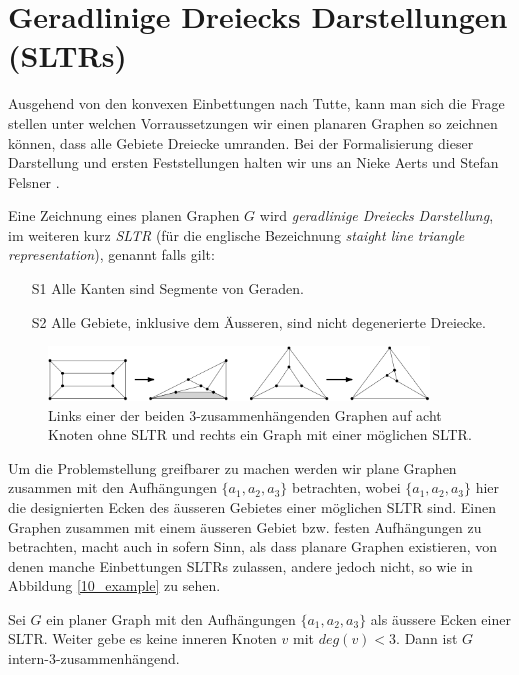 \section{Geradlinige Dreiecks Darstellungen (SLTRs)}

Ausgehend von den konvexen Einbettungen nach Tutte, kann man sich die Frage stellen unter welchen Vorraussetzungen wir einen planaren Graphen so zeichnen können, dass alle Gebiete Dreiecke umranden. Bei der Formalisierung dieser Darstellung und ersten Feststellungen halten wir uns an Nieke Aerts und Stefan Felsner \cite{af13,af15}.

\begin{definition}[SLTR]\label{defsltr}
Eine Zeichnung eines planen Graphen $G$ wird \textit{geradlinige Dreiecks Darstellung}, im weiteren kurz \textit{SLTR} (für die englische Bezeichnung \textit{staight line triangle representation}), genannt falls gilt:
\begin{itemize}
\item[S1] Alle Kanten sind Segmente von Geraden.
\item[S2] Alle Gebiete, inklusive dem Äusseren, sind nicht degenerierte Dreiecke.
\end{itemize}
\end{definition}

\begin{figure}[h]
	\centering
  \includegraphics[width=0.9\textwidth]{sltr-example.png}
	\caption{Links einer der beiden 3-zusammenhängenden Graphen auf acht Knoten ohne SLTR und rechts ein Graph mit einer möglichen SLTR.}
\end{figure}

Um die Problemstellung greifbarer zu machen werden wir plane Graphen zusammen mit den Aufhängungen $\{a_1,a_2,a_3\}$ betrachten, wobei $\{a_1,a_2,a_3\}$ hier die designierten Ecken des äusseren Gebietes einer möglichen SLTR sind. Einen Graphen zusammen mit einem äusseren Gebiet bzw. festen Aufhängungen zu betrachten, macht auch in sofern Sinn, als dass planare Graphen existieren, von denen manche Einbettungen SLTRs zulassen, andere jedoch nicht, so wie in Abbildung \ref{10_example} zu sehen.

\begin{proposition}\cite[Proposition 1.2]{af13}
Sei $G$ ein planer Graph mit den Aufhängungen $\{a_1,a_2,a_3\}$ als äussere Ecken einer SLTR. Weiter gebe es keine inneren Knoten $v$ mit $deg(v) < 3$. Dann ist $G$ intern-3-zusammenhängend.
\end{proposition}

